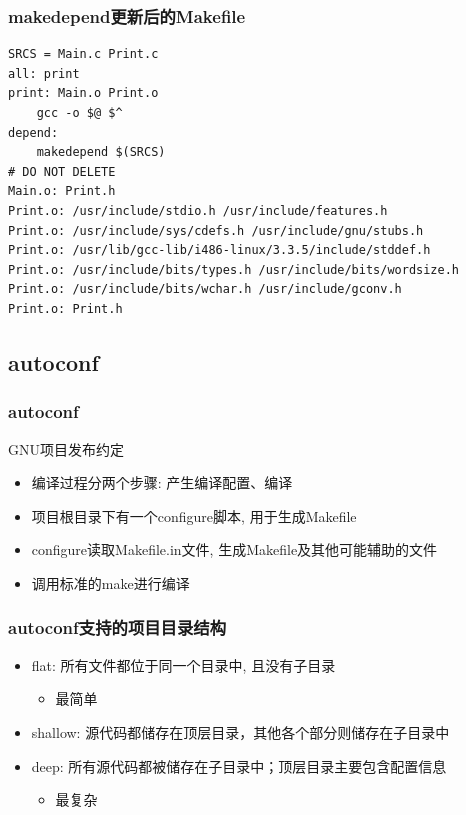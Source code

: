 \documentclass[compress]{beamer}
\begin{document}
\begin{frame}[containsverbatim]
  \frametitle{makedepend更新后的Makefile}
\begin{Verbatim}[showtabs=true,fontsize=\footnotesize]
SRCS = Main.c Print.c
all: print
print: Main.o Print.o
	gcc -o $@ $^
depend:
	makedepend $(SRCS)
# DO NOT DELETE
Main.o: Print.h
Print.o: /usr/include/stdio.h /usr/include/features.h
Print.o: /usr/include/sys/cdefs.h /usr/include/gnu/stubs.h
Print.o: /usr/lib/gcc-lib/i486-linux/3.3.5/include/stddef.h
Print.o: /usr/include/bits/types.h /usr/include/bits/wordsize.h
Print.o: /usr/include/bits/wchar.h /usr/include/gconv.h
Print.o: Print.h
\end{Verbatim}
  
\end{frame}

\subsection{autoconf}

\begin{frame}
  \frametitle{autoconf}
  GNU项目发布约定
  \begin{itemize}
	\item 编译过程分两个步骤: 产生编译配置、编译
	\item 项目根目录下有一个\alert{configure}脚本, 用于生成Makefile
	\item configure读取\alert{Makefile.in}文件, 生成Makefile及其他可能辅助的文件
	\item 调用标准的make进行编译
  \end{itemize}
  
\end{frame}

\begin{frame}
  \frametitle{autoconf支持的项目目录结构}
\begin{itemize}
  \item flat: 所有文件都位于同一个目录中, 且没有子目录
	\begin{itemize}
	  \item 最简单
	\end{itemize}

  \item shallow: 源代码都储存在顶层目录，其他各个部分则储存在子目录中
  \item deep: 所有源代码都被储存在子目录中；顶层目录主要包含配置信息
	\begin{itemize}
	  \item 最复杂
	\end{itemize}
\end{itemize}

  
\end{frame}
\end{document}
